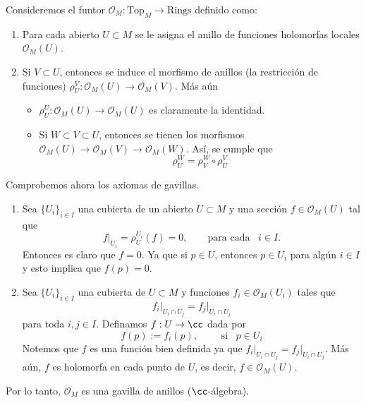 \begin{example}
    Consideremos el funtor $\mathscr{O}_M:\mathrm{Top}_M\to \mathrm{Rings}$ definido como:
    \begin{enumerate}
        \item Para cada abierto $U\subset M$ se le asigna el anillo de funciones holomorfas locales $\mathscr{O}_M(U)$.
        \item Si $V\subset U$, entonces se induce el morfismo de anillos (la restricción de funciones) $\rho_U^V:\mathscr{O}_M(U)\to\mathscr{O}_M(V)$. Más aún
        \begin{itemize}
            \item $\rho_U^U:\mathscr{O}_M(U)\to\mathscr{O}_M(U)$ es claramente la identidad.
            \item Si $W\subset V\subset U$, entonces se tienen los morfismos $\mathscr{O}_M(U)\to \mathscr{O}_M(V)\to\mathscr{O}_M(W)$. Así, se cumple que 
            $$\rho_U^W=\rho_V^W\circ\rho_U^V $$
        \end{itemize}
    \end{enumerate}
    Comprobemos ahora los axiomas de gavillas.
    \begin{enumerate}
        \item Sea $\{U_i\}_{i\in I}$ una cubierta de un abierto $U\subset M$ y una sección $f\in\mathscr{O}_M(U)$ tal que
        \begin{equation*}
            f\left.\right|_{U_i}=\rho_U^{U_i}(f)=0,\qquad \text{para cada }\enspace i\in I.
        \end{equation*}
        Entonces es claro que $f=0$. Ya que si $p\in U$, entonces $p\in U_i$ para algún $i\in I$ y esto implica que $f(p)=0$.
        \item Sea $\{U_i\}_{i\in I}$ una cubierta de $U\subset M$ y funciones $f_i\in \mathscr{O}_M(U_i)$ tales que
        \begin{equation*}
            f_i\left.\right|_{U_i\cap U_j}=f_j\left.\right|_{U_i\cap U_j}
        \end{equation*}
        para toda $i,j\in I$. Definamos $f:U\to\cc$ dada por
        \begin{equation*}
            f(p):=f_i(p),\qquad \text{ si }\enspace p\in U_i
        \end{equation*}
        Notemos que $f$ es una función bien definida ya que $f_i\left.\right|_{U_i\cap U_j}=f_j\left.\right|_{U_i\cap U_j}$. Más aún, $f$ es holomorfa en cada punto de $U$, es decir, $f\in\mathscr{O}_M(U)$.
    \end{enumerate}
    Por lo tanto, $\mathscr{O}_M$ es una gavilla de anillos ($\cc$-álgebra).
\end{example}

